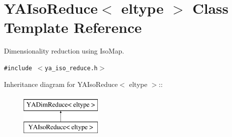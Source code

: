 \hypertarget{class_y_a_iso_reduce}{
\section{YAIso\-Reduce$<$ eltype $>$ Class Template Reference}
\label{class_y_a_iso_reduce}
}
Dimensionality reduction using Iso\-Map.  


{\tt \#include $<$ya\_\-iso\_\-reduce.h$>$}

Inheritance diagram for YAIso\-Reduce$<$ eltype $>$::\begin{figure}[H]
\begin{center}
\leavevmode
\includegraphics[height=2cm]{class_y_a_iso_reduce}
\end{center}
\end{figure}
